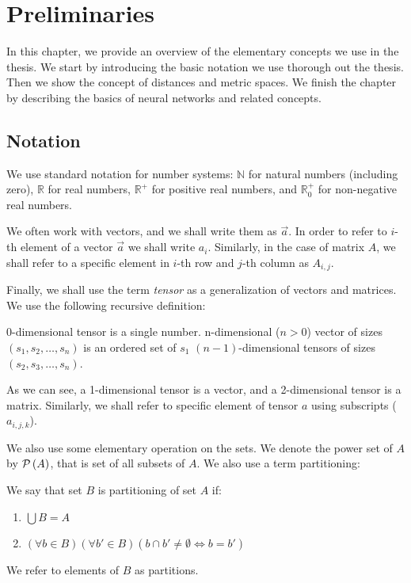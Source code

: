 \chapter{Preliminaries}

\label{ch:preliminaries}

In this chapter, we provide an overview of the elementary concepts we use in the thesis. We start by introducing the basic notation we use thorough out the thesis. Then we show the concept of distances and metric spaces. We finish the chapter by describing the basics of neural networks and related concepts.

\section{Notation}

We use standard notation for number systems: $\mathbb{N}$ for natural numbers (including zero), $\mathbb{R}$ for real numbers, $\mathbb{R}^+$ for positive real numbers, and $\mathbb{R}^+_0$ for non-negative real numbers.


We often work with vectors, and we shall write them as $\vec{a}$. In order to refer to $i$-th element of a vector $\vec{a}$ we shall write $a_i$. Similarly, in the case of matrix $A$, we shall refer to a specific element in $i$-th row and $j$-th column as $A_{i,j}$.

Finally, we shall use the term \emph{tensor} as a generalization of vectors and matrices. We use the following recursive definition:

\begin{defn}
0-dimensional tensor is a single number. n-dimensional ($n > 0$) vector of sizes
$(s_1, s_2, \ldots, s_n)$ is an ordered set of $s_1$ $(n-1)$-dimensional
tensors of sizes $(s_2, s_3, \ldots, s_n)$.
\end{defn}

As we can see, a 1-dimensional tensor is a vector, and a 2-dimensional tensor is a matrix. Similarly, we shall refer to specific element of tensor $a$ using subscripts ($a_{i,j,k}$).

We also use some elementary operation on the sets. We denote the power set of $A$ by $\mathcal{P}\left(A\right)$, that is set of all subsets of $A$. We also use a term partitioning:

\begin{defn}
We say that set $B$ is partitioning of set $A$ if:
\begin{enumerate}[label=(\roman*)]
    \item $\bigcup B = A$
    \item $(\forall b \in B) (\forall b' \in B) (b \cap b' \neq \emptyset \Leftrightarrow b = b')$
\end{enumerate}
We refer to elements of $B$ as partitions.
\end{defn}

